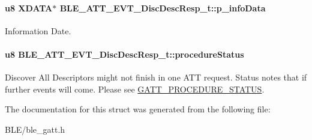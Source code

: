 \paragraph[{\texorpdfstring{p\+\_\+info\+Data}{p_infoData}}]{\setlength{\rightskip}{0pt plus 5cm}u8 X\+D\+A\+TA$\ast$ B\+L\+E\+\_\+\+A\+T\+T\+\_\+\+E\+V\+T\+\_\+\+Disc\+Desc\+Resp\+\_\+t\+::p\+\_\+info\+Data}\hypertarget{struct_b_l_e___a_t_t___e_v_t___disc_desc_resp__t_adffe04faceff762aa8b38387610f93c3}{}\label{struct_b_l_e___a_t_t___e_v_t___disc_desc_resp__t_adffe04faceff762aa8b38387610f93c3}
Information Date. 
\paragraph[{\texorpdfstring{procedure\+Status}{procedureStatus}}]{\setlength{\rightskip}{0pt plus 5cm}u8 B\+L\+E\+\_\+\+A\+T\+T\+\_\+\+E\+V\+T\+\_\+\+Disc\+Desc\+Resp\+\_\+t\+::procedure\+Status}\hypertarget{struct_b_l_e___a_t_t___e_v_t___disc_desc_resp__t_a1baf06a205c2b4a8b43de44fc4a0c81c}{}\label{struct_b_l_e___a_t_t___e_v_t___disc_desc_resp__t_a1baf06a205c2b4a8b43de44fc4a0c81c}
Discover All Descriptors might not finish in one A\+TT request. Status notes that if further events will come. Please see \hyperlink{group___g_a_t_t___p_r_o_c_e_d_u_r_e___s_t_a_t_u_s}{G\+A\+T\+T\+\_\+\+P\+R\+O\+C\+E\+D\+U\+R\+E\+\_\+\+S\+T\+A\+T\+US}. 

The documentation for this struct was generated from the following file\+:\begin{DoxyCompactItemize}
\item 
B\+L\+E/ble\+\_\+gatt.\+h\end{DoxyCompactItemize}
